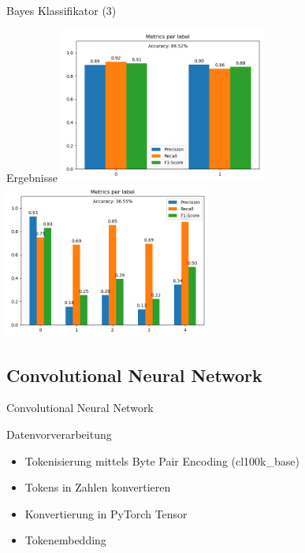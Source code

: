 \documentclass[aspectratio=169]{beamer} %
\begin{document}
\begin{frame}{Bayes Klassifikator (3)}
    \begin{block}{Ergebnisse}
        \includegraphics[width=6.8cm]{figures/evaluation_nbb.png} \includegraphics[width=6.8cm]{figures/evaluation_nbm.png}
    \end{block}
\end{frame}

\subsection{Convolutional Neural Network}

\begin{frame}{Convolutional Neural Network}
    \begin{block}{Datenvorverarbeitung}
        \begin{itemize}
            \item Tokenisierung mittels Byte Pair Encoding (cl100k\_base)

            \item Tokens in Zahlen konvertieren
    
            \item Konvertierung in PyTorch Tensor

            \item Tokenembedding
        \end{itemize}
    \end{block}
\end{frame}
\end{document}
